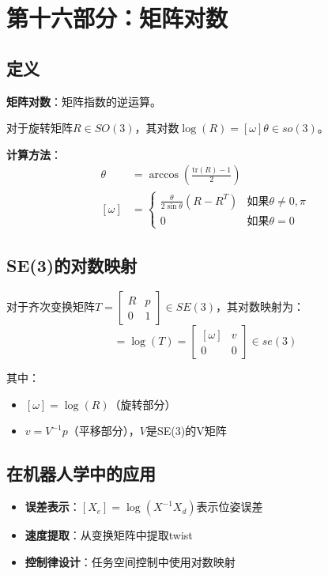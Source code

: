 \documentclass[12pt,a4paper]{article}
\begin{document}
\section{第十六部分：矩阵对数}

\subsection{定义}

\textbf{矩阵对数}：矩阵指数的逆运算。

对于旋转矩阵$R \in SO(3)$，其对数$\log(R) = [\omega]\theta \in so(3)$。

\textbf{计算方法}：
\begin{align}
\theta &= \arccos\left(\frac{\text{tr}(R) - 1}{2}\right) \\
[\omega] &= \begin{cases}
\frac{\theta}{2\sin\theta}(R - R^T) & \text{如果} \theta \neq 0, \pi \\
0 & \text{如果} \theta = 0
\end{cases}
\end{align}

\subsection{SE(3)的对数映射}

对于齐次变换矩阵$T = \begin{bmatrix} R & p \\ 0 & 1 \end{bmatrix} \in SE(3)$，其对数映射为：
\begin{equation}
[\xi] = \log(T) = \begin{bmatrix} [\omega] & v \\ 0 & 0 \end{bmatrix} \in se(3)
\end{equation}

其中：
\begin{itemize}
\item $[\omega] = \log(R)$（旋转部分）
\item $v = V^{-1} p$（平移部分），$V$是SE(3)的V矩阵
\end{itemize}

\subsection{在机器人学中的应用}

\begin{itemize}
\item \textbf{误差表示}：$[X_e] = \log(X^{-1} X_d)$表示位姿误差
\item \textbf{速度提取}：从变换矩阵中提取twist
\item \textbf{控制律设计}：任务空间控制中使用对数映射
\end{itemize}
\end{document}

